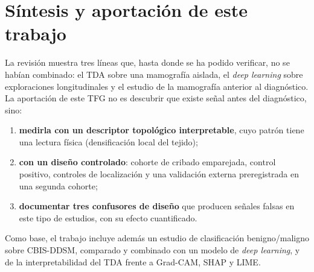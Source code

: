 \section{Síntesis y aportación de este trabajo}
La revisión muestra tres líneas que, hasta donde se ha podido verificar, no
se habían combinado: el TDA sobre una mamografía aislada, el \textit{deep
learning} sobre exploraciones longitudinales y el estudio de la mamografía
anterior al diagnóstico. La aportación de este TFG no es descubrir que existe
señal antes del diagnóstico, sino:
\begin{enumerate}
  \item \textbf{medirla con un descriptor topológico interpretable}, cuyo
        patrón tiene una lectura física (densificación local del tejido);
  \item \textbf{con un diseño controlado}: cohorte de cribado emparejada,
        control positivo, controles de localización y una validación externa
        preregistrada en una segunda cohorte;
  \item \textbf{documentar tres confusores de diseño} que producen señales
        falsas en este tipo de estudios, con su efecto cuantificado.
\end{enumerate}
Como base, el trabajo incluye además un estudio de clasificación
benigno/maligno sobre \mbox{CBIS-DDSM}, comparado y combinado con un modelo
de \textit{deep learning}, y de la interpretabilidad del TDA frente a
Grad-CAM, SHAP y LIME.
